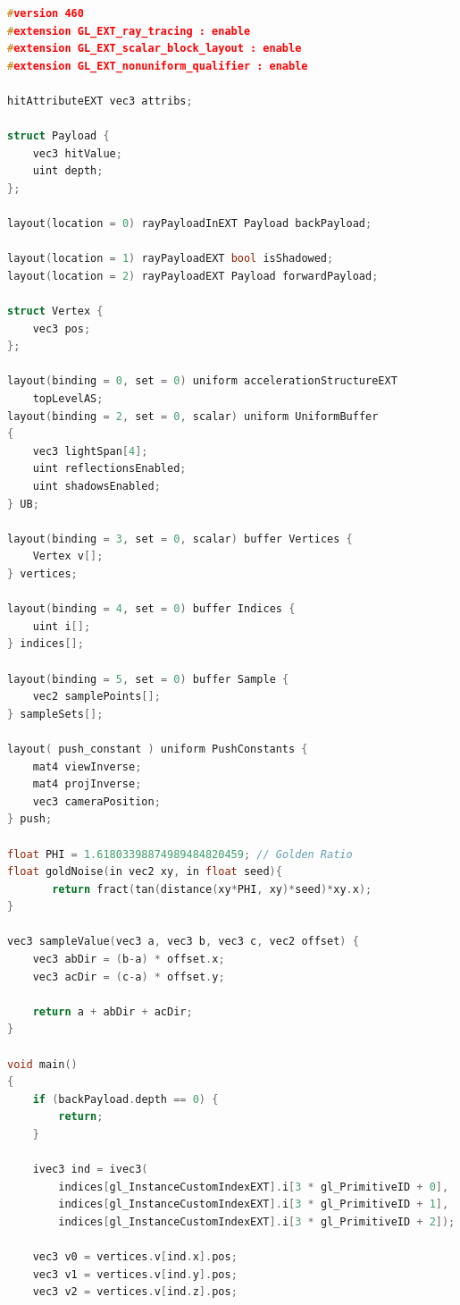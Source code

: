\documentclass[times, utf8, zavrsni, numeric]{fer}
\begin{document}
\begin{lstlisting}[language=c++, style=cppstyle, caption=Closest hit shader used in the application, frame=single]
#version 460
#extension GL_EXT_ray_tracing : enable
#extension GL_EXT_scalar_block_layout : enable
#extension GL_EXT_nonuniform_qualifier : enable

hitAttributeEXT vec3 attribs;

struct Payload {
    vec3 hitValue;
    uint depth;
};

layout(location = 0) rayPayloadInEXT Payload backPayload;

layout(location = 1) rayPayloadEXT bool isShadowed;
layout(location = 2) rayPayloadEXT Payload forwardPayload; 

struct Vertex {
    vec3 pos;
};

layout(binding = 0, set = 0) uniform accelerationStructureEXT
    topLevelAS;
layout(binding = 2, set = 0, scalar) uniform UniformBuffer 
{
    vec3 lightSpan[4];
    uint reflectionsEnabled;
    uint shadowsEnabled;
} UB;

layout(binding = 3, set = 0, scalar) buffer Vertices {
    Vertex v[];
} vertices;

layout(binding = 4, set = 0) buffer Indices {
    uint i[];
} indices[];

layout(binding = 5, set = 0) buffer Sample {
    vec2 samplePoints[];
} sampleSets[];

layout( push_constant ) uniform PushConstants {
    mat4 viewInverse;
    mat4 projInverse;
    vec3 cameraPosition;
} push;

float PHI = 1.61803398874989484820459; // Golden Ratio   
float goldNoise(in vec2 xy, in float seed){
       return fract(tan(distance(xy*PHI, xy)*seed)*xy.x);
}

vec3 sampleValue(vec3 a, vec3 b, vec3 c, vec2 offset) {
    vec3 abDir = (b-a) * offset.x;
    vec3 acDir = (c-a) * offset.y;

    return a + abDir + acDir;
}

void main()
{
    if (backPayload.depth == 0) {
        return;
    }

    ivec3 ind = ivec3(
        indices[gl_InstanceCustomIndexEXT].i[3 * gl_PrimitiveID + 0],
        indices[gl_InstanceCustomIndexEXT].i[3 * gl_PrimitiveID + 1],
        indices[gl_InstanceCustomIndexEXT].i[3 * gl_PrimitiveID + 2]);

    vec3 v0 = vertices.v[ind.x].pos;
    vec3 v1 = vertices.v[ind.y].pos;
    vec3 v2 = vertices.v[ind.z].pos;


\end{lstlisting}
\end{document}
